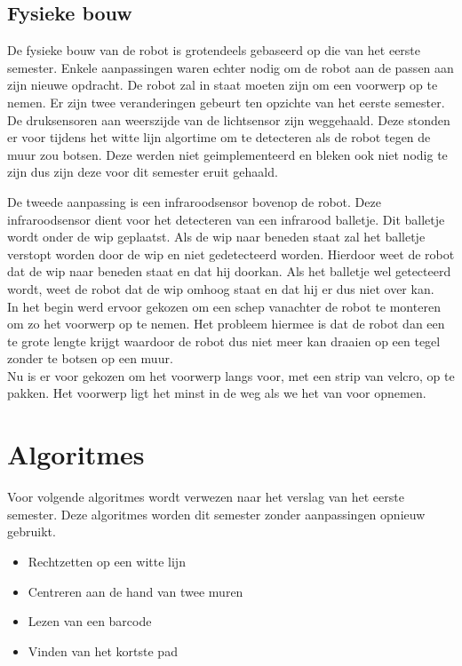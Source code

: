\documentclass[tt1]{penoverslag}
\begin{document}
\subsection{Fysieke bouw}
\label{ssec:fysb}

De fysieke bouw van de robot is grotendeels gebaseerd op die van het eerste semester. Enkele aanpassingen waren echter nodig om de robot aan de passen aan zijn nieuwe opdracht. De robot zal in staat moeten zijn om een voorwerp op te nemen. Er zijn twee veranderingen gebeurt ten opzichte van het eerste semester. De druksensoren aan weerszijde van de lichtsensor zijn weggehaald. Deze stonden er voor tijdens het witte lijn algortime om te detecteren als de robot tegen de muur zou botsen. Deze werden niet geimplementeerd en bleken ook niet nodig te zijn dus zijn deze voor dit semester eruit gehaald. 

De tweede aanpassing is een infraroodsensor bovenop de robot. Deze infraroodsensor dient voor het detecteren van een infrarood balletje. Dit balletje wordt onder de wip geplaatst. Als de wip naar beneden staat zal het balletje verstopt worden door de wip en niet gedetecteerd worden. Hierdoor weet de robot dat de wip naar beneden staat en dat hij doorkan. Als het balletje wel getecteerd wordt, weet de robot dat de wip omhoog staat en dat hij er dus niet over kan. \\

In het begin werd ervoor gekozen om een schep vanachter de robot te monteren om zo het voorwerp op te nemen. Het probleem hiermee is dat de robot dan een te grote lengte krijgt waardoor de robot dus niet meer kan draaien op een tegel zonder te botsen op een muur. \\

Nu is er voor gekozen om het voorwerp langs voor, met een strip van velcro, op te pakken. Het voorwerp ligt het minst in de weg als we het van voor opnemen.




\section{Algoritmes}
Voor volgende algoritmes wordt verwezen naar het verslag van het eerste semester. Deze algoritmes worden dit semester zonder aanpassingen opnieuw gebruikt.
\begin{itemize}
	\item Rechtzetten op een witte lijn
	\item Centreren aan de hand van twee muren
	\item Lezen van een barcode
	\item Vinden van het kortste pad
\end{itemize}
\end{document}

